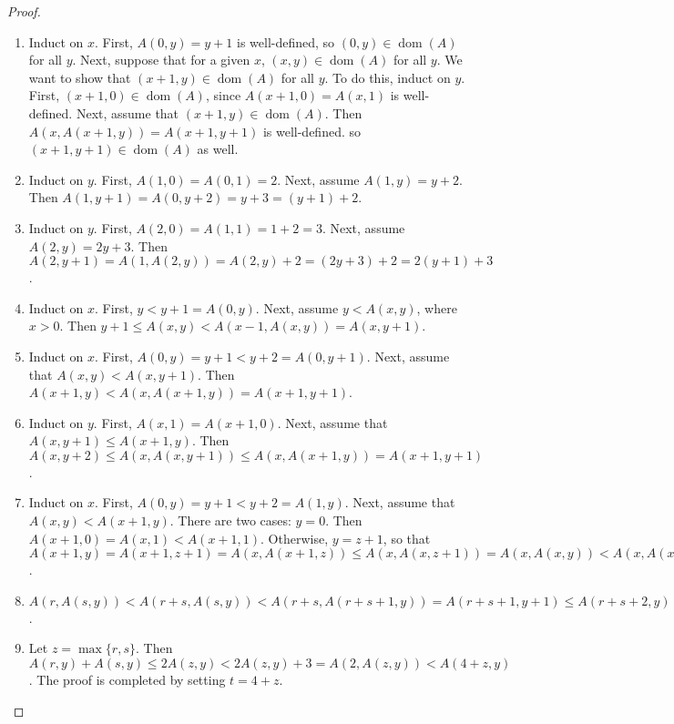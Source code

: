 \documentclass[12pt]{article}
\begin{document}
\begin{proof}
\begin{enumerate}
\item Induct on $x$.  First, $A(0,y)=y+1$ is well-defined, so $(0,y)\in \operatorname{dom}(A)$ for all $y$.  Next, suppose that for a given $x$, $(x,y)\in \operatorname{dom}(A)$ for all $y$.  We want to show that $(x+1,y)\in \operatorname{dom}(A)$ for all $y$.  To do this, induct on $y$.  First, $(x+1,0)\in \operatorname{dom}(A)$, since $A(x+1,0)=A(x,1)$ is well-defined.  Next, assume that $(x+1,y) \in \operatorname{dom}(A)$.  Then $A(x,A(x+1,y))=A(x+1,y+1)$ is well-defined.  so $(x+1,y+1)\in \operatorname{dom}(A)$ as well.
\item Induct on $y$.  First, $A(1,0)=A(0,1)=2$.  Next, assume $A(1,y)=y+2$.  Then $A(1,y+1)= A(0,y+2)=y+3=(y+1)+2$.
\item Induct on $y$.  First, $A(2,0)=A(1,1)=1+2=3$.  Next, assume $A(2,y)=2y+3$.  Then $A(2,y+1)=A(1,A(2,y))=A(2,y)+2=(2y+3)+2=2(y+1)+3$.
\item Induct on $x$.  First, $y < y+1 = A(0,y)$.  Next, assume $y<A(x,y)$, where $x>0$.  Then $y+1 \le A(x,y) < A(x-1, A(x,y)) = A(x,y+1)$.
\item Induct on $x$.  First, $A(0,y)=y+1<y+2=A(0,y+1)$.  Next, assume that $A(x,y)<A(x,y+1)$.  Then $A(x+1,y)< A(x,A(x+1,y)) = A(x+1,y+1)$.
\item Induct on $y$.  First, $A(x,1)=A(x+1,0)$.  Next, assume that $A(x,y+1)\le A(x+1,y)$.  Then $A(x,y+2)\le A(x,A(x,y+1)) \le A(x,A(x+1,y))=A(x+1,y+1)$.
\item Induct on $x$.  First, $A(0,y)=y+1 < y+2 = A(1,y)$.  Next, assume that $A(x,y) < A(x+1,y)$.  There are two cases: $y=0$.  Then $A(x+1,0)=A(x,1)< A(x+1,1)$.  Otherwise, $y=z+1$, so that $A(x+1,y) =A(x+1,z+1) = A(x,A(x+1,z)) \le A(x,A(x,z+1)) = A(x,A(x,y)) < A(x,A(x+1,y)) = A(x+1,y+1)$.
\item $A(r,A(s,y)) < A(r+s,A(s,y)) < A(r+s,A(r+s+1,y)) = A(r+s+1,y+1) \le A(r+s+2,y)$.
\item Let $z=\max\lbrace r,s\rbrace$.  Then $A(r,y)+A(s,y)\le 2A(z,y) < 2A(z,y)+3 = A(2,A(z,y)) < A(4+z,y)$.  The proof is completed by setting $t=4+z$.
\end{enumerate}
\end{proof}
\end{document}
